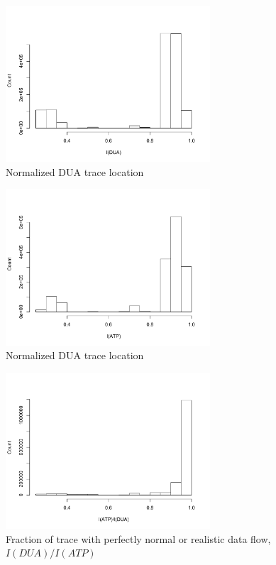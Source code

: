 \begin{figure}
\centering
\includegraphics[width=3in]{dua.pdf}
\caption{Normalized DUA trace location}
\label{fig:dua-hist}
\end{figure}

\begin{figure}
\centering
\includegraphics[width=3in]{atp.pdf}
\caption{Normalized DUA trace location}
\label{fig:atp-hist}
\end{figure}

\begin{figure}
\centering
\includegraphics[width=3in]{rdf.pdf}
\caption{Fraction of trace with perfectly normal or realistic data flow, $I(DUA)/I(ATP)$}
\label{fig:rdf-hist}
\end{figure}




